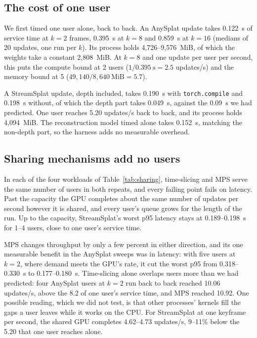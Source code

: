 \subsection{The cost of one user}

We first timed one user alone, back to back.
An AnySplat update takes 0.122~s of service time at $k=2$ frames, 0.395~s at $k=8$ and 0.859~s at $k=16$ (medians of 20 updates, one run per $k$). %
Its process holds 4,726--9,576~MiB, of which the weights take a constant 2,808~MiB. %
At $k=8$ and one update per user per second, this puts the compute bound at 2 users ($1/0.395~\text{s} = 2.5$ updates/s) and the memory bound at 5 ($49{,}140/8{,}640~\text{MiB} = 5.7$). %

A StreamSplat update, depth included, takes 0.190~s with \texttt{torch.compile} and 0.198~s without, of which the depth part takes 0.049~s, against the 0.09~s we had predicted. %
One user reaches 5.20 updates/s back to back, and its process holds 4,094~MiB. %
The reconstruction model timed alone takes 0.152~s, matching the non-depth part, so the harness adds no measurable overhead. %

\subsection{Sharing mechanisms add no users}

In each of the four workloads of Table~\ref{tab:sharing}, time-slicing and MPS serve the same number of users in both repeats, and every failing point fails on latency. %
Past the capacity the GPU completes about the same number of updates per second however it is shared, and every user's queue grows for the length of the run. %
Up to the capacity, StreamSplat's worst p95 latency stays at 0.189--0.198~s for 1--4 users, close to one user's service time. %

MPS changes throughput by only a few percent in either direction, and its one measurable benefit in the AnySplat sweeps was in latency: with five users at $k=2$, where demand meets the GPU's rate, it cut the worst p95 from 0.318--0.330~s to 0.177--0.180~s. %
Time-slicing alone overlaps users more than we had predicted: four AnySplat users at $k=2$ run back to back reached 10.06 updates/s, above the 8.2 of one user's service time, and MPS reached 10.92. %
One possible reading, which we did not test, is that other processes' kernels fill the gaps a user leaves while it works on the CPU. %
For StreamSplat at one keyframe per second, the shared GPU completes 4.62--4.73 updates/s, 9--11\% below the 5.20 that one user reaches alone. %

